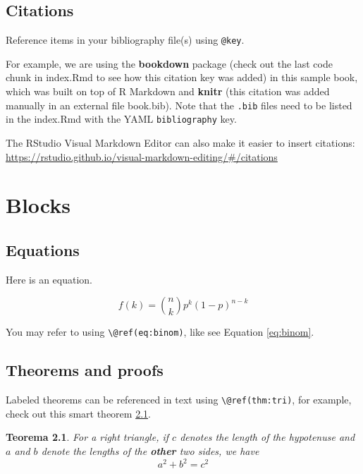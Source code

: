 \documentclass[
  20pt,
]{book}
\newtheorem{theorem}{Teorema}[chapter]
\theoremstyle{definition}
\theoremstyle{definition}
\theoremstyle{definition}
\theoremstyle{definition}
\theoremstyle{remark}
\begin{document}
\section{Citations}\label{citations}

Reference items in your bibliography file(s) using \texttt{@key}.

For example, we are using the \textbf{bookdown} package \citep{R-bookdown} (check out the last code chunk in index.Rmd to see how this citation key was added) in this sample book, which was built on top of R Markdown and \textbf{knitr} \citep{xie2015} (this citation was added manually in an external file book.bib).
Note that the \texttt{.bib} files need to be listed in the index.Rmd with the YAML \texttt{bibliography} key.

The RStudio Visual Markdown Editor can also make it easier to insert citations: \url{https://rstudio.github.io/visual-markdown-editing/\#/citations}

\chapter{Blocks}\label{blocks}

\section{Equations}\label{equations}

Here is an equation.

\begin{equation} 
  f\left(k\right) = \binom{n}{k} p^k\left(1-p\right)^{n-k}
  \label{eq:binom}
\end{equation}

You may refer to using \texttt{\textbackslash{}@ref(eq:binom)}, like see Equation \eqref{eq:binom}.

\section{Theorems and proofs}\label{theorems-and-proofs}

Labeled theorems can be referenced in text using \texttt{\textbackslash{}@ref(thm:tri)}, for example, check out this smart theorem \ref{thm:tri}.

\begin{theorem}
\protect\hypertarget{thm:tri}{}\label{thm:tri}For a right triangle, if \(c\) denotes the \emph{length} of the hypotenuse
and \(a\) and \(b\) denote the lengths of the \textbf{other} two sides, we have
\[a^2 + b^2 = c^2\]
\end{theorem}
\end{document}
